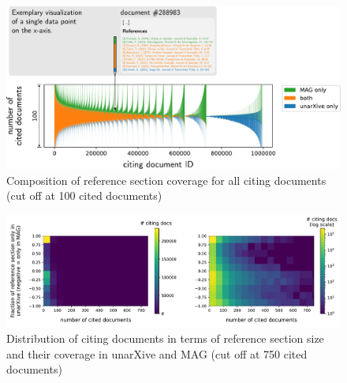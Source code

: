 \begin{figure}[tb]
  \centering
    \includegraphics[width=\textwidth]{figures/corpus/Fig5.pdf}
  \caption[Composition of reference section coverage for all citing documents]{Composition of reference section coverage for all citing documents (cut off at 100 cited documents)}
  \label{fig:citcomp}
\end{figure}

\begin{figure}[tb]
  \centering
    \includegraphics[width=\textwidth]{figures/corpus/Fig6.pdf}
  \caption[Distribution of citing documents in terms of reference section size and their coverage in unarXive and MAG]{Distribution of citing documents in terms of reference section size and their coverage in unarXive and MAG (cut off at 750 cited documents)}
  \label{fig:citcount2balance}
\end{figure}

